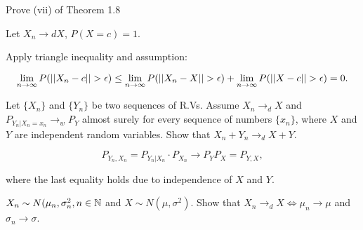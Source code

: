 \documentclass[]{book}
\theoremstyle{definition}
\theoremstyle{definition}
\theoremstyle{definition}
\theoremstyle{remark}
\let\BeginKnitrBlock\begin \let\EndKnitrBlock\end
\begin{document}
\BeginKnitrBlock{exercise}[Ex 117]
\protect\hypertarget{exr:unnamed-chunk-59}{}{\label{exr:unnamed-chunk-59}
\iffalse (Ex 117) \fi{} }
\EndKnitrBlock{exercise}

\BeginKnitrBlock{exercise}[Ex 126]
\protect\hypertarget{exr:unnamed-chunk-60}{}{\label{exr:unnamed-chunk-60}
\iffalse (Ex 126) \fi{} }Prove (vii) of Theorem 1.8
\EndKnitrBlock{exercise}

\BeginKnitrBlock{solution}
\iffalse{} {Solution. } \fi{}Let \(X_n \rightarrow d X\),
\(P(X = c) = 1\).

Apply triangle inequality and assumption:

\[
  \lim_{n \rightarrow \infty} P(\left | \left | X_n - c \right | \right | > \epsilon) \le \lim_{n \rightarrow \infty} P(\left | \left | X_n - X \right | \right | > \epsilon) + \lim_{n \rightarrow \infty} P(\left | \left | X - c \right | \right | > \epsilon) = 0.
\]
\EndKnitrBlock{solution}

\BeginKnitrBlock{exercise}[Ex 127]
\protect\hypertarget{exr:unnamed-chunk-62}{}{\label{exr:unnamed-chunk-62}
\iffalse (Ex 127) \fi{} }
\EndKnitrBlock{exercise}

\BeginKnitrBlock{exercise}[Ex 128]
\protect\hypertarget{exr:unnamed-chunk-63}{}{\label{exr:unnamed-chunk-63}
\iffalse (Ex 128) \fi{} }
\EndKnitrBlock{exercise}

\BeginKnitrBlock{exercise}[Ex 137]
\protect\hypertarget{exr:unnamed-chunk-64}{}{\label{exr:unnamed-chunk-64}
\iffalse (Ex 137) \fi{} }Let \(\{X_n\}\) and \(\{Y_n\}\) be two
sequences of R.Vs. Assume \(X_n \rightarrow_d X\) and
\(P_{Y_n | X_n = x_n} \rightarrow_w P_Y\) almost surely for every
sequence of numbers \(\{x_n\}\), where \(X\) and \(Y\) are independent
random variables. Show that \(X_n + Y_n \rightarrow_d X + Y\).
\EndKnitrBlock{exercise}

\BeginKnitrBlock{solution}
\iffalse{} {Solution. } \fi{} \[
  P_{Y_n,X_n} = P_{Y_n|X_n}\cdot P_{X_n} \rightarrow P_Y P_X = P_{Y,X},
\]

where the last equality holds due to independence of \(X\) and \(Y\).
\EndKnitrBlock{solution}

\BeginKnitrBlock{exercise}[Ex 138]
\protect\hypertarget{exr:unnamed-chunk-66}{}{\label{exr:unnamed-chunk-66}
\iffalse (Ex 138) \fi{} }
\EndKnitrBlock{exercise}

\BeginKnitrBlock{exercise}[Ex 140]
\protect\hypertarget{exr:unnamed-chunk-67}{}{\label{exr:unnamed-chunk-67}
\iffalse (Ex 140) \fi{} }\(X_n \sim N(\mu_n, \sigma^2_n, n \in \mathbb{N}\) and
\(X \sim N(\mu, \sigma^2)\). Show that
\(X_n \to_d X \iff \mu_n \to \mu\) and \(\sigma_n \to \sigma\).
\EndKnitrBlock{exercise}
\end{document}
